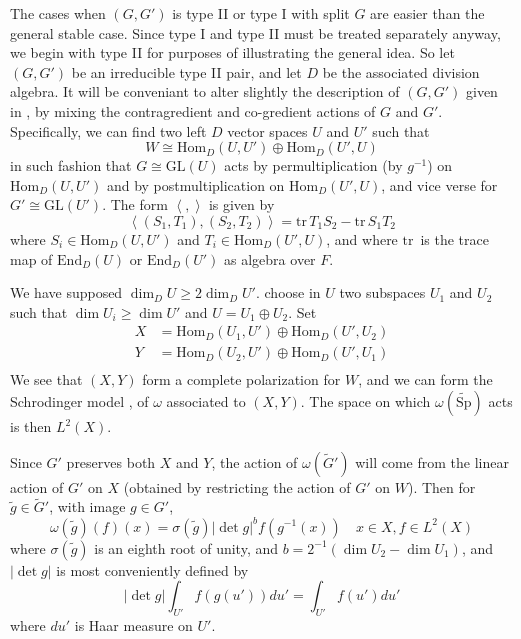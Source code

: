 \documentclass[12pt]{amsart}
\def\inn#1#2{\left\langle{#1},{#2}\right\rangle}
\def\abs#1{\left|{#1}\right|}
\def\tSp{{\widetilde{\mathrm{Sp}}}}
\def\GL{{\mathrm{GL}}}
\def\Hom{{\mathrm{Hom}}}
\def\End{{\mathrm{End}}}
\def\tG{{\widetilde{G}}}
\def\tg{{\widetilde{g}}}
\def\tr{{\mathrm{tr\,}}}
\begin{document}
The cases when $(G,G')$ is type II or type I with split $G$ are 
easier than the general stable case. Since type I and type II must be
treated separately anyway, we begin with type II for purposes 
of illustrating the general idea. So let $(G,G')$ be an irreducible 
type II pair, and let $D$ be the associated division algebra. 
It will be conveniant to alter slightly the description of 
$(G,G')$ given in \cite{Howe1979}, by mixing the contragredient 
and co-gredient actions of $G$ and $G'$. 
Specifically, we can find two left $D$ vector spaces $U$ and $U'$ such that 
\begin{equation}\label{eq:2}
W\cong \Hom_D(U,U')\oplus\Hom_D(U',U)
\end{equation}
in such fashion that $G\cong \GL(U)$ acts by permultiplication 
(by $g^{-1}$) on $\Hom_D(U,U')$ and by postmultiplication
on $\Hom_D(U',U)$, and vice verse for $G'\cong \GL(U')$. 
The form $\inn{}{}$ is given by 
\begin{equation}\label{eq:3}
\inn{(S_1,T_1)}{(S_2,T_2)} = \tr T_1S_2 - \tr S_1T_2
\end{equation}
where $S_i\in \Hom_D(U,U')$ and $T_i\in \Hom_D(U',U)$, and 
where $\tr$ is the trace map of $\End_D(U)$ or $\End_D(U')$
as algebra over $F$. 

We have supposed $\dim_DU\geq 2\dim_D U'$. choose in $U$ two subspaces
$U_1$ and $U_2$ such that $\dim U_i \geq \dim U'$ and $U=U_1\oplus U_2$. 
Set 
\begin{equation}\label{eq:4}
\begin{split}
X &= \Hom_D(U_1, U') \oplus \Hom_D(U',U_2) \\
Y &= \Hom_D(U_2, U') \oplus \Hom_D(U',U_1) \\
\end{split}
\end{equation}
We see that $(X,Y)$ form a complete polarization for $W$, and we can 
form the Schrodinger model \cite{Cartier1966}, \cite{Gelbart1979} of 
$\omega$ associated to $(X,Y)$. The space on which $\omega(\tSp)$
acts is then $L^2(X)$.

Since $G'$ preserves both $X$ and $Y$, the action of $\omega(\tG')$ will
come from the linear action of $G'$ on $X$ (obtained by restricting the
action of $G'$ on $W$). Then \cite{Gelbart1979} for $\tg\in \tG'$, 
with image $g\in G'$,
\begin{equation}\label{eq:5}
\omega(\tg)(f)(x) = \sigma(\tg)\abs{\det g}^b f(g^{-1}(x))
\quad x\in X, f\in L^2(X)
\end{equation}
where $\sigma(\tg)$ is an eighth root of unity, and 
$b = 2^{-1}(\dim U_2 -\dim U_1)$, and $\abs{\det g}$ 
is most conveniently defined by
\begin{equation}\label{eq:6}
\abs{\det g}\int_{U'} f(g(u')) du'=\int_{U'}f(u') du'
\end{equation}
where $du'$ is Haar measure on $U'$.
\end{document}
